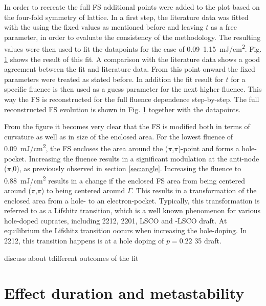 In order to recreate the full FS additional points were added to the plot based on the four-fold symmetry of lattice.
In a first step, the literature data was fitted with the using the fixed values as mentioned before and leaving $t$ as a free parameter, in order to evaluate the consistency of the methodology.
The resulting values were then used to fit the datapoints for the case of \qty{0.09}{ \qty{1.15}{\milli\joule/\centi\meter\squared}}.
Fig. \ref{} shows the result of this fit.
A comparison with the literature data shows a good agreement between the fit and literature data.
From this point onward the fixed parameters were treated as stated before.
In addition the fit result for $t$ for a specific fluence is then used as a guess parameter for the next higher fluence.
This way the FS is reconstructed for the full fluence dependence step-by-step.
The full reconstructed FS evolution is shown in Fig. \ref{} together with the datapoints.

From the figure it becomes very clear that the FS is modified both in terms of curvature as well as in size of the enclosed area.
For the lowest fluence of \qty{0.09}{\milli\joule/\centi\meter\squared}, the FS encloses the area around the ($\pi$,$\pi$)-point and forms a hole-pocket.
Increasing the fluence results in a significant modulation at the anti-node ($\pi$,0), as previously observed in section \ref{sec:angle}.
Increasing the fluence to  \qty{0.88}{\milli\joule/\centi\meter\squared} results in a change if the enclosed FS area from being centered around ($\pi$,$\pi$) to being centered around $\Gamma$.
This results in a transformation of the enclosed area from a hole- to an electron-pocket.
Typically, this transformation is referred to as a Lifshitz transition, which is a well known phenomenon for various hole-doped cuprates, including 2212, 2201, LSCO and -LSCO \cite{} draft.
At equilibrium the Lifshitz transition occurs when increasing the hole-doping.
In 2212, this transition happens is at a hole doping of $p=0.22$ \cite{} 35 draft.

discuss about tdifferent outcomes of the fit

\section{Effect duration and metastability}
